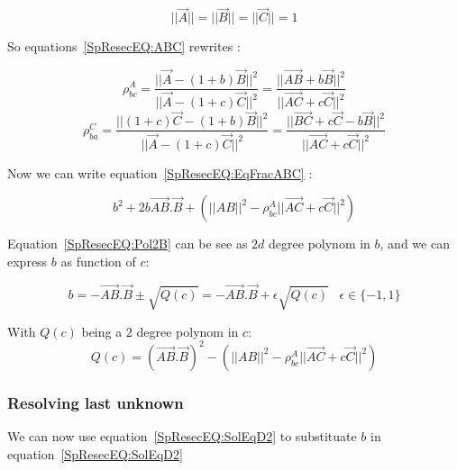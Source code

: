 \begin{equation}
	|| \Vec{A}|| = || \Vec{B}|| = || \Vec{C}|| = 1
\end{equation}

So equations~\ref{SpResecEQ:ABC} rewrites :

\begin{equation}
	\rho^A_{bc}  
	= \frac{|| \Vec{A} -  (1+b) \Vec{B} ||^2 }{||\Vec{A} - (1+c) \Vec{C}||^2}
	= \frac{|| \overrightarrow{AB} +  b \Vec{B} ||^2 }{||\overrightarrow{AC}  + c \Vec{C}||^2}  \label{SpResecEQ:EqFracABC}
\end{equation}
\begin{equation}
	\rho^C_{ba}  
	= \frac{|| (1+c) \Vec{C} -  (1+b) \Vec{B} ||^2 } {||\Vec{A} -  (1+c) \Vec{C}||^2}
	= \frac{|| \overrightarrow{BC} + c \Vec{C} -  b \Vec{B} ||^2 } {||\overrightarrow{AC}  + c \Vec{C}||^2}
	 \label{SpResecEQ:EqFracCBA}
\end{equation}

Now we can write equation~\ref{SpResecEQ:EqFracABC} :

\begin{equation}
	b^2 + 2 b \overrightarrow{AB}. \Vec{B} + (||AB||^2 -   \rho^A_{bc} ||\overrightarrow{AC}  + c \Vec{C}||^2)
	\label{SpResecEQ:Pol2B}
\end{equation}

Equation~\ref{SpResecEQ:Pol2B} can be see as $2d$ degree polynom in $b$, and we can express $b$ as function of $c$:

\begin{equation}
	b = -\overrightarrow{AB}. \Vec{B} \pm \sqrt{Q(c)}  = -\overrightarrow{AB}. \Vec{B} + \epsilon \sqrt{Q(c)} 
	 \;\;\;  \epsilon \in \{-1,1\}  \label{SpResecEQ:SolEqD2}
\end{equation}

With $Q(c)$ being a $2$ degree polynom in $c$:
\begin{equation}
	Q(c) = (\overrightarrow{AB}. \Vec{B})^2 -  (||AB||^2 -   \rho^A_{bc} ||\overrightarrow{AC}  + c \Vec{C}||^2)
\end{equation}

\subsubsection{Resolving last unknown}

We can now use equation~\ref{SpResecEQ:SolEqD2} to substituate $b$  in equation~\ref{SpResecEQ:SolEqD2}

